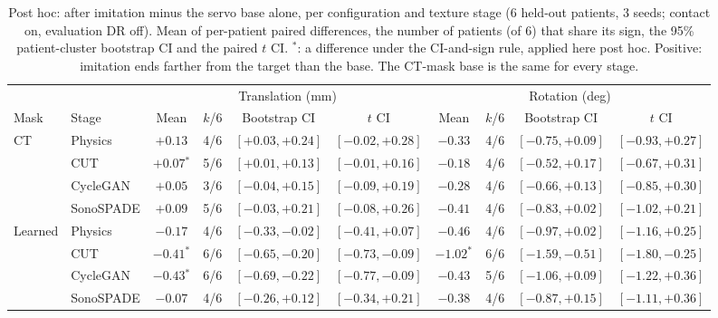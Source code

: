 
\begin{table}[t]
\caption{Post hoc: after imitation minus the servo base alone, per configuration and texture stage (6 held-out patients, 3 seeds; contact on, evaluation DR off). Mean of per-patient paired differences, the number of patients (of 6) that share its sign, the 95\% patient-cluster bootstrap CI and the paired $t$ CI. $^{\ast}$: a difference under the CI-and-sign rule, applied here post hoc. Positive: imitation ends farther from the target than the base. The CT-mask base is the same for every stage.}
\label{tab:imitation-base}
\centering
\renewcommand{\baselinestretch}{1}\footnotesize
\setlength{\tabcolsep}{3pt}
\begin{tabular}{@{}ll cccc cccc@{}}
\toprule
 & & \multicolumn{4}{c}{Translation (mm)} & \multicolumn{4}{c}{Rotation (deg)} \\
\cmidrule(lr){3-6}\cmidrule(l){7-10}
Mask & Stage & Mean & $k$/6 & Bootstrap CI & $t$ CI & Mean & $k$/6 & Bootstrap CI & $t$ CI \\
\midrule
CT & Physics & $+0.13$ & 4/6 & $[+0.03, +0.24]$ & $[-0.02, +0.28]$ & $-0.33$ & 4/6 & $[-0.75, +0.09]$ & $[-0.93, +0.27]$ \\
 & CUT & $+0.07$$^{\ast}$ & 5/6 & $[+0.01, +0.13]$ & $[-0.01, +0.16]$ & $-0.18$ & 4/6 & $[-0.52, +0.17]$ & $[-0.67, +0.31]$ \\
 & CycleGAN & $+0.05$ & 3/6 & $[-0.04, +0.15]$ & $[-0.09, +0.19]$ & $-0.28$ & 4/6 & $[-0.66, +0.13]$ & $[-0.85, +0.30]$ \\
 & SonoSPADE & $+0.09$ & 5/6 & $[-0.03, +0.21]$ & $[-0.08, +0.26]$ & $-0.41$ & 4/6 & $[-0.83, +0.02]$ & $[-1.02, +0.21]$ \\
\addlinespace
Learned & Physics & $-0.17$ & 4/6 & $[-0.33, -0.02]$ & $[-0.41, +0.07]$ & $-0.46$ & 4/6 & $[-0.97, +0.02]$ & $[-1.16, +0.25]$ \\
 & CUT & $-0.41$$^{\ast}$ & 6/6 & $[-0.65, -0.20]$ & $[-0.73, -0.09]$ & $-1.02$$^{\ast}$ & 6/6 & $[-1.59, -0.51]$ & $[-1.80, -0.25]$ \\
 & CycleGAN & $-0.43$$^{\ast}$ & 6/6 & $[-0.69, -0.22]$ & $[-0.77, -0.09]$ & $-0.43$ & 5/6 & $[-1.06, +0.09]$ & $[-1.22, +0.36]$ \\
 & SonoSPADE & $-0.07$ & 4/6 & $[-0.26, +0.12]$ & $[-0.34, +0.21]$ & $-0.38$ & 4/6 & $[-0.87, +0.15]$ & $[-1.11, +0.36]$ \\
\bottomrule
\end{tabular}
\end{table}
